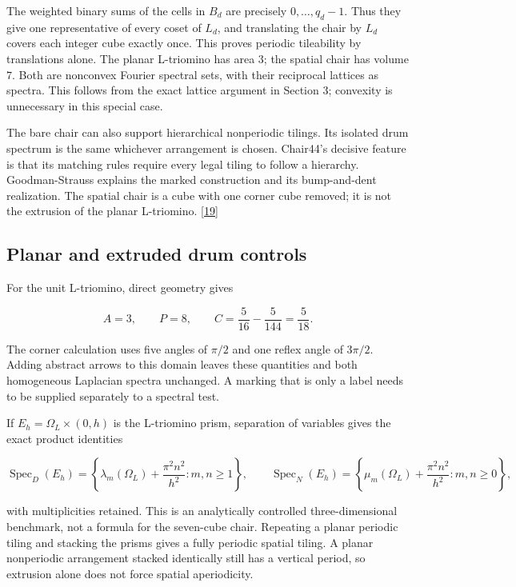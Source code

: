 \documentclass[11pt]{article}
\begin{document}
The weighted binary sums of the cells in \(B_d\) are precisely \(0,\ldots,q_d-1\). Thus they give one representative of every coset of \(L_d\), and translating the chair by \(L_d\) covers each integer cube exactly once. This proves periodic tileability by translations alone. The planar L-triomino has area \(3\); the spatial chair has volume \(7\). Both are nonconvex Fourier spectral sets, with their reciprocal lattices as spectra. This follows from the exact lattice argument in Section 3; convexity is unnecessary in this special case.



The bare chair can also support hierarchical nonperiodic tilings. Its isolated drum spectrum is the same whichever arrangement is chosen. Chair44's decisive feature is that its matching rules require every legal tiling to follow a hierarchy. Goodman-Strauss explains the marked construction and its bump-and-dent realization. The spatial chair is a cube with one corner cube removed; it is not the extrusion of the planar L-triomino. \hyperlink{ref19}{[19]}



\subsection*{Planar and extruded drum controls}


For the unit L-triomino, direct geometry gives


\[ A=3,\qquad P=8,\qquad
C=\frac{5}{16}-\frac{5}{144}=\frac{5}{18}. \]

The corner calculation uses five angles of \(\pi/2\) and one reflex angle of \(3\pi/2\). Adding abstract arrows to this domain leaves these quantities and both homogeneous Laplacian spectra unchanged. A marking that is only a label needs to be supplied separately to a spectral test.



If \(E_h=\Omega_L\times(0,h)\) is the L-triomino prism, separation of variables gives the exact product identities


\[ \operatorname{Spec}_D(E_h)=\left\{\lambda_m(\Omega_L)+\frac{\pi^2n^2}{h^2}:m,n\ge1\right\},\qquad
\operatorname{Spec}_N(E_h)=\left\{\mu_m(\Omega_L)+\frac{\pi^2n^2}{h^2}:m,n\ge0\right\}, \]

with multiplicities retained. This is an analytically controlled three-dimensional benchmark, not a formula for the seven-cube chair. Repeating a planar periodic tiling and stacking the prisms gives a fully periodic spatial tiling. A planar nonperiodic arrangement stacked identically still has a vertical period, so extrusion alone does not force spatial aperiodicity.
\end{document}
